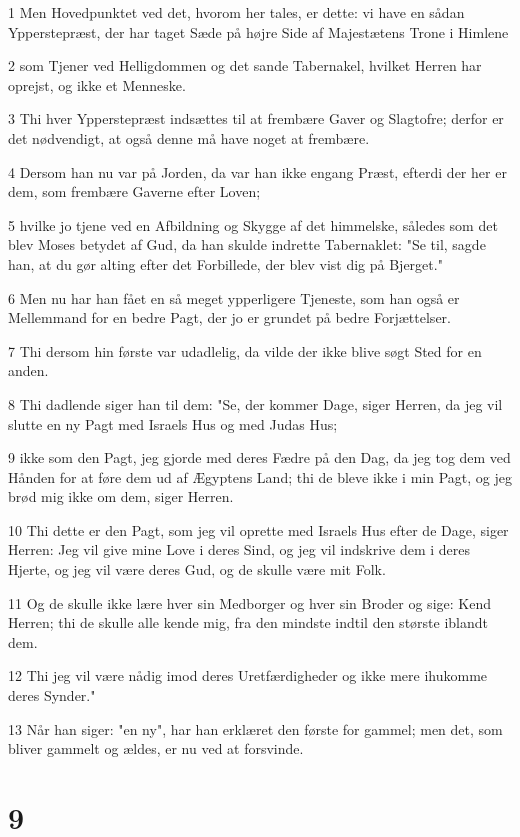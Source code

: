 \par 1 Men Hovedpunktet ved det, hvorom her tales, er dette: vi have en sådan Ypperstepræst, der har taget Sæde på højre Side af Majestætens Trone i Himlene
\par 2 som Tjener ved Helligdommen og det sande Tabernakel, hvilket Herren har oprejst, og ikke et Menneske.
\par 3 Thi hver Ypperstepræst indsættes til at frembære Gaver og Slagtofre; derfor er det nødvendigt, at også denne må have noget at frembære.
\par 4 Dersom han nu var på Jorden, da var han ikke engang Præst, efterdi der her er dem, som frembære Gaverne efter Loven;
\par 5 hvilke jo tjene ved en Afbildning og Skygge af det himmelske, således som det blev Moses betydet af Gud, da han skulde indrette Tabernaklet: "Se til, sagde han, at du gør alting efter det Forbillede, der blev vist dig på Bjerget."
\par 6 Men nu har han fået en så meget ypperligere Tjeneste, som han også er Mellemmand for en bedre Pagt, der jo er grundet på bedre Forjættelser.
\par 7 Thi dersom hin første var udadlelig, da vilde der ikke blive søgt Sted for en anden.
\par 8 Thi dadlende siger han til dem: "Se, der kommer Dage, siger Herren, da jeg vil slutte en ny Pagt med Israels Hus og med Judas Hus;
\par 9 ikke som den Pagt, jeg gjorde med deres Fædre på den Dag, da jeg tog dem ved Hånden for at føre dem ud af Ægyptens Land; thi de bleve ikke i min Pagt, og jeg brød mig ikke om dem, siger Herren.
\par 10 Thi dette er den Pagt, som jeg vil oprette med Israels Hus efter de Dage, siger Herren: Jeg vil give mine Love i deres Sind, og jeg vil indskrive dem i deres Hjerte, og jeg vil være deres Gud, og de skulle være mit Folk.
\par 11 Og de skulle ikke lære hver sin Medborger og hver sin Broder og sige: Kend Herren; thi de skulle alle kende mig, fra den mindste indtil den største iblandt dem.
\par 12 Thi jeg vil være nådig imod deres Uretfærdigheder og ikke mere ihukomme deres Synder."
\par 13 Når han siger: "en ny", har han erklæret den første for gammel; men det, som bliver gammelt og ældes, er nu ved at forsvinde.

\chapter{9}

